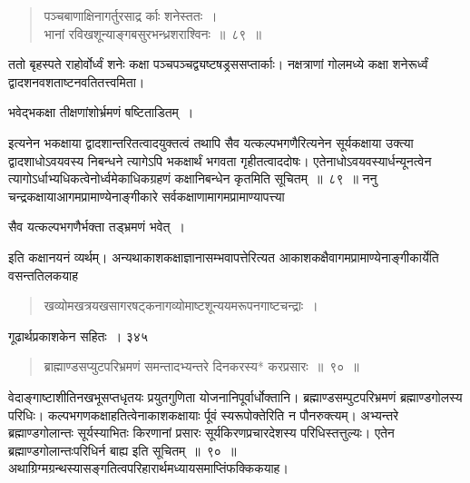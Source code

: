 \documentclass[11pt, openany]{book}
\begin{document}

 \begin{quote}
{\ssi पञ्चबाणाक्षिनागर्तुरसाद्र र्काः शनेस्ततः~।\\
भानां रविखशून्याङ्गबसुरभन्ध्रशराश्विनः~॥~८९~॥}
\end{quote}
 ततो बृहस्पते राहोर्वोर्ध्वं शनेः कक्षा पञ्चपञ्चद्व्यष्टषड्रससप्तार्काः। नक्षत्राणां गोलमध्ये कक्षा शनेरूर्ध्वं द्वादशनवशताष्टनवतितत्त्वमिता। 

\begin{center}
{\qt भवेद्भकक्षा तीक्षणांशोर्भ्रमणं षष्टिताडितम्~।} 
\end{center}

इत्यनेन भकक्षाया द्वादशान्तरितत्वादयुक्तत्वं तथापि सैव यत्कल्पभगणैरित्यनेन सूर्यकक्षाया उक्त्या द्वादशाधोऽवयवस्य निबन्धने त्यागेऽपि भकक्षार्थं भगवता गृहीतत्वाददोषः। एतेनाधोऽवयवस्यार्धन्यूनत्वेन त्यागोऽर्धाभ्यधिकत्वेनोर्ध्वमेकाधिकग्रहणं कक्षानिबन्धेन कृतमिति सूचितम्~॥~८९~॥ 
ननु चन्द्रकक्षायाआगमप्रामाण्येनाङ्गीकारे सर्वकक्षाणामागमप्रामाण्यापत्त्या \textendash

\begin{center}
{\qt सैव यत्कल्पभगणैर्भक्ता तड्भ्रमणं भवेत्~।} 
\end{center}

इति कक्षानयनं व्यर्थम्। अन्यथाकाशकक्षाज्ञानासम्भवापत्तेरित्यत आकाशकक्षैवागमप्रामाण्येनाङ्गीकार्येति वसन्ततिलकयाह \textendash


\begin{quote}
{\ssi खव्योमखत्रयखसागरषट्कनागव्योमाष्टशून्ययमरूपनगाष्टचन्द्राः~।}
%
\end{quote}

\newpage


\hspace{3cm} गूढार्थप्रकाशकेन सहितः~। \hfill ३४५
\vspace{1cm}
 
\begin{quote}
{\ssi ब्राह्माण्डसप्युटपरिभ्रमणं समन्तादभ्यन्तरे दिनकरस्य* करप्रसारः~॥~९०~॥}
\end{quote}

 वेदाङ्गाष्टाशीतिनखभूसप्तधृतयः प्रयुतगुणिता योजनानिपूर्वार्धोक्तानि। ब्रह्माण्डसम्पुटपरिभ्रमणं ब्रह्माण्डगोलस्य परिधिः। कल्पभगणकक्षाहतित्वेनाकाशकक्षायाः र्पूवं स्यरूपोक्तेरिति न पौनरुक्त्यम्। अभ्यन्तरे ब्रह्माण्डगोलान्तः सूर्यस्याभितः किरणानां प्रसारः सूर्यकिरणप्रचारदेशस्य परिधिस्तत्तुल्यः। एतेन ब्रह्माण्डगोलान्तःपरिधिर्न बाह्य इति सूचितम्~॥~९०~॥\\
\noindent अथाग्रिग्मग्रन्थस्यासङ्गतित्वपरिहारार्थमध्यायसमाप्तिंफक्किकयाह। 
\end{document}
